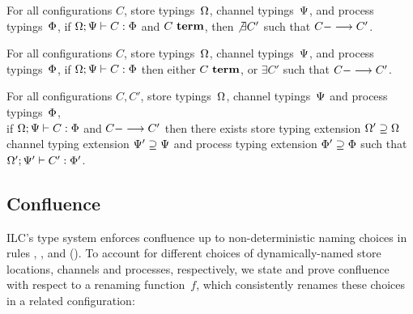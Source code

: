 
\begin{lemma}
For all configurations $C$,
store typings~$\Omega$,
channel typings~$\Psi$,
and process typings~$\Phi$,
%
if $\Omega ; \Psi |- C : \Phi$
and $C~\textbf{term}$,
then $\not\exists C'$ such that $C ---> C'$.
\end{lemma}


\begin{theorem}[Progress]
For all configurations $C$,
store typings~$\Omega$,
channel typings~$\Psi$,
and process typings~$\Phi$,
%
if $\Omega ; \Psi |- C : \Phi$
then 
either $C~\textbf{term}$,
or $\exists C'$ such that $C ---> C'$.
\end{theorem}

\begin{theorem}[Preservation]
For all configurations $C, C'$,
store typings~$\Omega$,
channel typings~$\Psi$
and process typings~$\Phi$,
\\
%
 if $\Omega ; \Psi |- C : \Phi$
and $C ---> C'$ 
then there exists 
store typing extension $\Omega' \supseteq \Omega$
channel typing extension $\Psi' \supseteq \Psi$
and process typing extension $\Phi' \supseteq \Phi$
such that $\Omega' ; \Psi' |- C' : \Phi'$.
\end{theorem}


\subsection{Confluence}

ILC's type system enforces confluence 
up to non-deterministic naming choices in 
rules , , and  ().
%
To account for different choices of dynamically-named
store locations, channels and processes, respectively, 
we state and prove confluence
with respect to a renaming function~$f$, which consistently renames
these choices in a related configuration:

